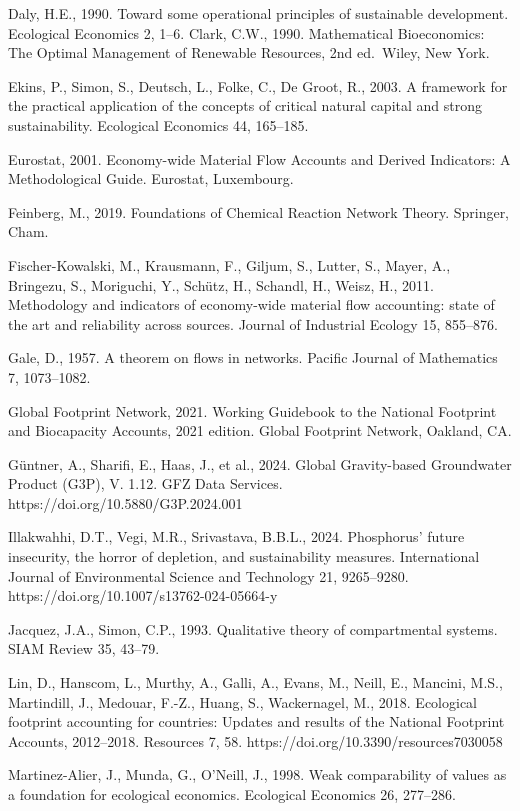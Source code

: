 \documentclass[11pt]{article}
\begin{document}
Daly, H.E., 1990. Toward some operational principles of sustainable
development. Ecological Economics 2, 1--6. Clark, C.W., 1990.
Mathematical Bioeconomics: The Optimal Management of Renewable
Resources, 2nd ed.~Wiley, New York.

Ekins, P., Simon, S., Deutsch, L., Folke, C., De Groot, R., 2003. A
framework for the practical application of the concepts of critical
natural capital and strong sustainability. Ecological Economics 44,
165--185.

Eurostat, 2001. Economy-wide Material Flow Accounts and Derived
Indicators: A Methodological Guide. Eurostat, Luxembourg.

Feinberg, M., 2019. Foundations of Chemical Reaction Network Theory.
Springer, Cham.

Fischer-Kowalski, M., Krausmann, F., Giljum, S., Lutter, S., Mayer, A.,
Bringezu, S., Moriguchi, Y., Sch\"utz, H., Schandl, H., Weisz, H., 2011.
Methodology and indicators of economy-wide material flow accounting:
state of the art and reliability across sources. Journal of Industrial
Ecology 15, 855--876.

Gale, D., 1957. A theorem on flows in networks. Pacific Journal of Mathematics 7, 1073--1082.

Global Footprint Network, 2021. Working Guidebook to the National Footprint and Biocapacity Accounts, 2021 edition. Global Footprint Network, Oakland, CA.

G\"untner, A., Sharifi, E., Haas, J., et al., 2024. Global Gravity-based
Groundwater Product (G3P), V. 1.12. GFZ Data Services.
https://doi.org/10.5880/G3P.2024.001

Illakwahhi, D.T., Vegi, M.R., Srivastava, B.B.L., 2024. Phosphorus'
future insecurity, the horror of depletion, and sustainability measures.
International Journal of Environmental Science and Technology 21,
9265--9280. https://doi.org/10.1007/s13762-024-05664-y

Jacquez, J.A., Simon, C.P., 1993. Qualitative theory of compartmental
systems. SIAM Review 35, 43--79.

Lin, D., Hanscom, L., Murthy, A., Galli, A., Evans, M., Neill, E.,
Mancini, M.S., Martindill, J., Medouar, F.-Z., Huang, S., Wackernagel,
M., 2018. Ecological footprint accounting for countries: Updates and
results of the National Footprint Accounts, 2012--2018. Resources 7, 58.
https://doi.org/10.3390/resources7030058

Martinez-Alier, J., Munda, G., O'Neill, J., 1998. Weak comparability of
values as a foundation for ecological economics. Ecological Economics
26, 277--286.
\end{document}
